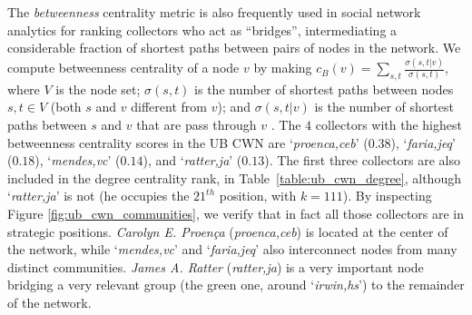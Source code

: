 The \textit{betweenness} centrality metric is also frequently used in social network analytics for ranking collectors who act as ``bridges'', intermediating a considerable fraction of shortest paths between pairs of nodes in the network. 
We compute betweenness centrality of a node $v$ by making $c_B(v) =\sum_{s,t} \frac{\sigma(s, t|v)}{\sigma(s, t)}$, where $V$ is the node set; $\sigma(s,t)$ is the number of shortest paths between nodes $s, t \in V$ (both $s$ and $v$ different from $v$); and $\sigma(s,t|v)$ is the number of shortest paths between $s$ and $v$ that are pass through $v$ \cite{Brandes2008}. 
The $4$ collectors with the highest betweenness centrality scores in the UB CWN are `\textit{proenca,ceb}' ($0.38$), `\textit{faria,jeq}' ($0.18$), `\textit{mendes,vc}' ($0.14$), and `\textit{ratter,ja}' ($0.13$).
The first three collectors are also included in the degree centrality rank, in Table~\ref{table:ub_cwn_degree}, although `\textit{ratter,ja}' is not (he occupies the $21^{th}$ position, with $k=111$).
By inspecting Figure \ref{fig:ub_cwn_communities}, we verify that in fact all those collectors are in strategic positions.
\textit{Carolyn E. Proença} (\textit{proenca,ceb}) is located at the center of the network, while `\textit{mendes,vc}' and `\textit{faria,jeq}' also interconnect nodes from many distinct communities.
\textit{James A. Ratter} (\textit{ratter,ja}) is a very important node bridging a very relevant group (the green one, around `\textit{irwin,hs}') to the remainder of the network.

